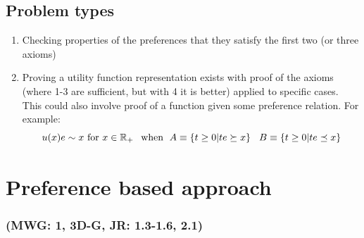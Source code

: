 \documentclass{article}
\begin{document}
\subsection{Problem types}
\begin{enumerate}
    \item Checking properties of the preferences that they satisfy the first two (or three axioms)
    \item Proving a utility function representation exists with proof of the axioms (where 1-3 are sufficient, but with 4 it is better) applied to specific cases. This could also involve proof of a function given some preference relation. For example:
        \[ 
        u(x)e \sim x \text{ for } x \in \mathbb{R_{+}} \\ \hspace{1.5mm} \text{ when } \hspace{1mm}
        A \equiv \{t \geq 0 | te \succeq x\} \\ \hspace{3mm}
        B \equiv \{t \geq 0 | te \preceq x\}
        \]
\end{enumerate}


\newpage
\section{Preference based approach}
\subsubsection*{(MWG: 1, 3D-G, JR: 1.3-1.6, 2.1)}
\end{document}
